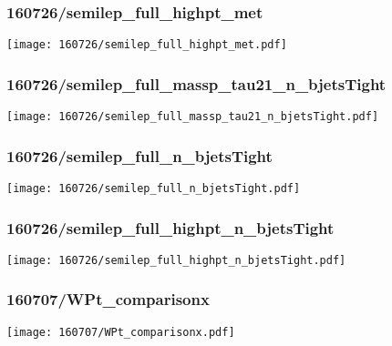 \begin{frame}
   \frametitle{\small 160726/semilep\_full\_highpt\_met}
   \centering
   \texttt{[image: 160726/semilep\_full\_highpt\_met.pdf]}
\end{frame}

\begin{frame}
   \frametitle{\small 160726/semilep\_full\_massp\_tau21\_n\_bjetsTight}
   \centering
   \texttt{[image: 160726/semilep\_full\_massp\_tau21\_n\_bjetsTight.pdf]}
\end{frame}

\begin{frame}
   \frametitle{\small 160726/semilep\_full\_n\_bjetsTight}
   \centering
   \texttt{[image: 160726/semilep\_full\_n\_bjetsTight.pdf]}
\end{frame}

\begin{frame}
   \frametitle{\small 160726/semilep\_full\_highpt\_n\_bjetsTight}
   \centering
   \texttt{[image: 160726/semilep\_full\_highpt\_n\_bjetsTight.pdf]}
\end{frame}

\begin{frame}
   \frametitle{\small 160707/WPt\_comparisonx}
   \centering
   \texttt{[image: 160707/WPt\_comparisonx.pdf]}
\end{frame}

